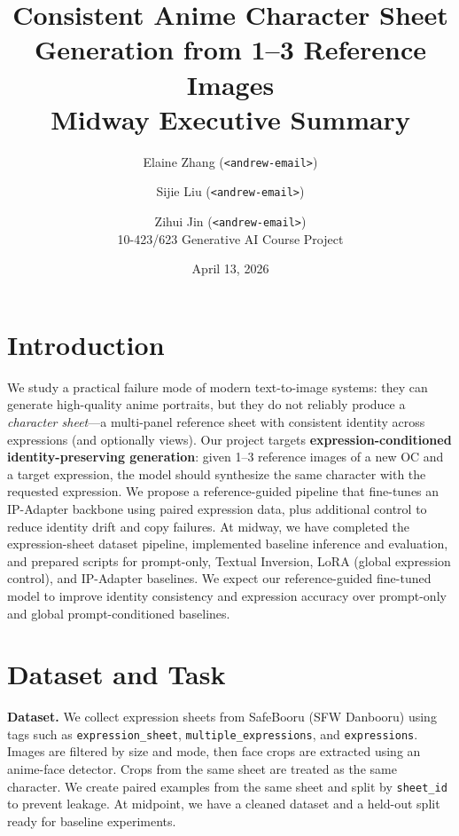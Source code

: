 \documentclass[twocolumn,11pt]{article}
\begin{document}
\title{Consistent Anime Character Sheet Generation from 1--3 Reference Images\\Midway Executive Summary}
\author{
Elaine Zhang (\texttt{<andrew-email>}) \and
Sijie Liu (\texttt{<andrew-email>}) \and
Zihui Jin (\texttt{<andrew-email>})\\
10-423/623 Generative AI Course Project
}
\date{April 13, 2026}
\maketitle
\small

\section{Introduction}
We study a practical failure mode of modern text-to-image systems: they can generate high-quality anime portraits, but they do not reliably produce a \emph{character sheet}---a multi-panel reference sheet with consistent identity across expressions (and optionally views). Our project targets \textbf{expression-conditioned identity-preserving generation}: given 1--3 reference images of a new OC and a target expression, the model should synthesize the same character with the requested expression. We propose a reference-guided pipeline that fine-tunes an IP-Adapter backbone using paired expression data, plus additional control to reduce identity drift and copy failures. At midway, we have completed the expression-sheet dataset pipeline, implemented baseline inference and evaluation, and prepared scripts for prompt-only, Textual Inversion, LoRA (global expression control), and IP-Adapter baselines. We expect our reference-guided fine-tuned model to improve identity consistency and expression accuracy over prompt-only and global prompt-conditioned baselines.

\section{Dataset and Task}
\textbf{Dataset.} We collect expression sheets from SafeBooru (SFW Danbooru) using tags such as \texttt{expression\_sheet}, \texttt{multiple\_expressions}, and \texttt{expressions}. Images are filtered by size and mode, then face crops are extracted using an anime-face detector. Crops from the same sheet are treated as the same character. We create paired examples from the same sheet and split by \texttt{sheet\_id} to prevent leakage. At midpoint, we have a cleaned dataset and a held-out split ready for baseline experiments.
\end{document}
